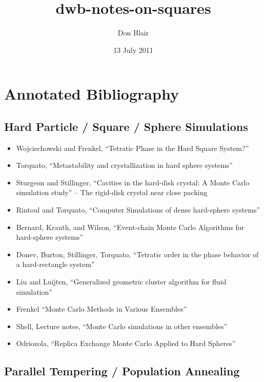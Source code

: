 \documentclass[11pt]{article}
\title{dwb-notes-on-squares}
\author{Don Blair}
\date{13 July 2011}
\begin{document}
\maketitle

\setcounter{tocdepth}{3}
\tableofcontents
\vspace*{1cm}

\section{Annotated Bibliography}
\label{sec-1}


\subsection{Hard Particle / Square / Sphere Simulations}
\label{sec-1.1}

\begin{itemize}
\item Wojciechowski and Frenkel, ``Tetratic Phase in the Hard Square System?'' \cite{Wojciechowski2004}
\item Torquato, ``Metastability and crystallization in hard sphere systems'' \cite{Rintoul1996}
\item Sturgeon and Stillinger, ``Cavities in the hard-disk crystal: A Monte Carlo simulation study'' \cite{Sturgeon1992} -- The rigid-disk crystal near close packing
\item Rintoul and Torquato, ``Computer Simulations of dense hard-sphere systems'' \cite{Rintoul1996a}
\item Bernard, Krauth, and Wilson, ``Event-chain Monte Carlo Algorithms for hard-sphere systems''
\item Donev, Burton, Stillinger, Torquato, ``Tetratic order in the phase behavior of a hard-rectangle system'' \cite{Donev2006}
\item Liu and Luijten, ``Generalized geometric cluster algorithm for fluid simulation'' \cite{Liu2005}
\item Frenkel ``Monte Carlo Methods in Various Ensembles'' \cite{Frenkel1996}
\item Shell, Lecture notes, ``Monte Carlo simulations in other ensembles'' \cite{Shell2009}
\item Odriozola,  ``Replica Exchange Monte Carlo Applied to Hard Spheres''  \cite{Odriozola2009}
\end{itemize}
\subsection{Parallel Tempering / Population Annealing}
\label{sec-1.2}
\end{document}
